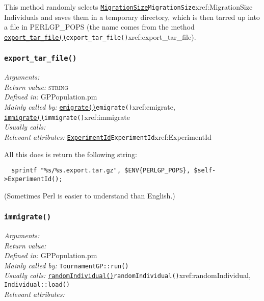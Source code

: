 \documentclass[a4paper]{article}
\begin{document}
This method randomly selects \hyperref[no]{\texttt{MigrationSize}}{\texttt{MigrationSize}}{xref:MigrationSize} Individuals and
saves them in a temporary directory, which is then tarred up into a
file in PERLGP\_POPS (the name comes from the method
\hyperref[no]{\texttt{export\_tar\_file()}}{\texttt{export\_tar\_file()}}{xref:export_tar_file}).


\subsubsection{\texttt{export\_tar\_file()}}\label{xref:export_tar_file}
\begin{flushleft}
\textit{Arguments:} \\
\textit{Return value:} \textsc{string}\\
\textit{Defined in:} GPPopulation.pm\\
\textit{Mainly called by:} \hyperref[no]{\texttt{emigrate()}}{\texttt{emigrate()}}{xref:emigrate}, \hyperref[no]{\texttt{immigrate()}}{\texttt{immigrate()}}{xref:immigrate}\\
\textit{Usually calls:} \\
\textit{Relevant attributes:} \hyperref[no]{\texttt{ExperimentId}}{\texttt{ExperimentId}}{xref:ExperimentId}
\end{flushleft}

All this does is return the following string:
\begin{verbatim}
  sprintf "%s/%s.export.tar.gz", $ENV{PERLGP_POPS}, $self->ExperimentId();
\end{verbatim}


(Sometimes Perl is easier to understand than English.)


\subsubsection{\texttt{immigrate()}}\label{xref:immigrate}
\begin{flushleft}
\textit{Arguments:} \\
\textit{Return value:} \\
\textit{Defined in:} GPPopulation.pm\\
\textit{Mainly called by:} \texttt{TournamentGP::run()}\\
\textit{Usually calls:} \hyperref[no]{\texttt{randomIndividual()}}{\texttt{randomIndividual()}}{xref:randomIndividual}, \texttt{Individual::load()}\\
\textit{Relevant attributes:}
\end{flushleft}
\end{document}
